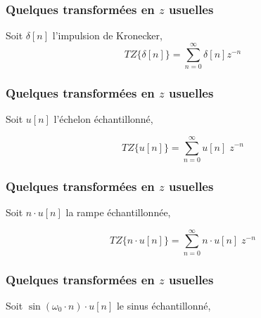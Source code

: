 \documentclass{beamer}
\begin{document}
\begin{frame} 
\frametitle{Quelques transformées en $z$ usuelles}
Soit $\delta [n]$ l'impulsion de Kronecker,
\vspace{0.3 cm}
\[TZ\{ \delta[n] \} = \sum_{n = 0}^{\infty} \delta[n] z^{-n}\]

\vspace{0.3 cm}

\vspace{0.3 cm}


\end{frame}

\begin{frame} 
\frametitle{Quelques transformées en $z$ usuelles}

Soit $u [n]$ l'échelon échantillonné,

\[TZ\{ u[n] \} = \sum_{n = 0}^{\infty} u[n] \; z^{-n}  \]

\vspace{0.3cm}
\end{frame} 

\begin{frame} 
\frametitle{Quelques transformées en $z$ usuelles}

Soit $n\cdot u [n]$ la rampe échantillonnée,

\[TZ\{ n\cdot u[n] \} = \sum_{n = 0}^{\infty} n \cdot u[n] \; z^{-n} \]

\vspace{0.3cm}


\end{frame}

\begin{frame} 
\frametitle{Quelques transformées en $z$ usuelles}

Soit $\sin(\omega_0 \cdot n )\cdot u [n]$ le sinus échantillonné,

\vspace{0.3cm}



\end{frame}
\end{document}
